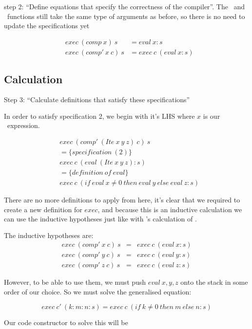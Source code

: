 \documentclass {article}
\begin{document}
step 2: ``Define equations that specify the correctness of the compiler''.
The \exec\ and \comp\ functions still take the same
type of arguments as before,
so there is no need to update the specifications yet

\begin{eqnarray*}
	 &exec\  (comp\  x)\  s &= eval\  x:s \\
	 &exec\  (comp'\  x\  c)\ s &= exec\  c\  (eval\ x:s) 
\end{eqnarray*}

\subsection{Calculation}

Step 3: ``Calculate definitions that 
		satisfy these specifications''

In order to satisfy specification 2,
we begin with it's LHS where $x$ is our
\ite\ expression.

\begin{align*}
	&exec\ (comp'\ (Ite\ x\ y\ z)\ c)\ s \\
	&= \{specification\ (2) \} \\
	&exec\ c\ (eval\ (Ite\ x\ y\ z) : s) \\
	&= \{definition\ of\ eval\} \\
	&exec\ c\ (if\ eval\ x \not= 0\ then\ eval\ y\ else\ eval\ z :s)
\end{align*}

There are no more definitions to apply from here,
it's clear that we required to
create a new definition for $exec$,
and because this is an inductive calculation
we can use the inductive hypotheses
just like with \BH's calculation of \add.

The inductive hypotheses are:
\begin{eqnarray*}
	exec\ (comp'\ x\ c)\ s &=& exec\ c\ (eval\ x:s) \\
	exec\ (comp'\ y\ c)\ s &=& exec\ c\ (eval\ y:s) \\
	exec\ (comp'\ z\ c)\ s &=& exec\ c\ (eval\ z:s)
\end{eqnarray*}

However, to be able to use them,
we must push $eval\ x,y,z$ onto the stack
in some order of our choice.
So we must solve the generalised equation:

	\[ exec\ c'\ (k:m:n:s) 
		= exec\ c\ (if\ k \not= 0\ then\ m\ else\ n:s)\]

Our code constructor to solve this will be
\end{document}
